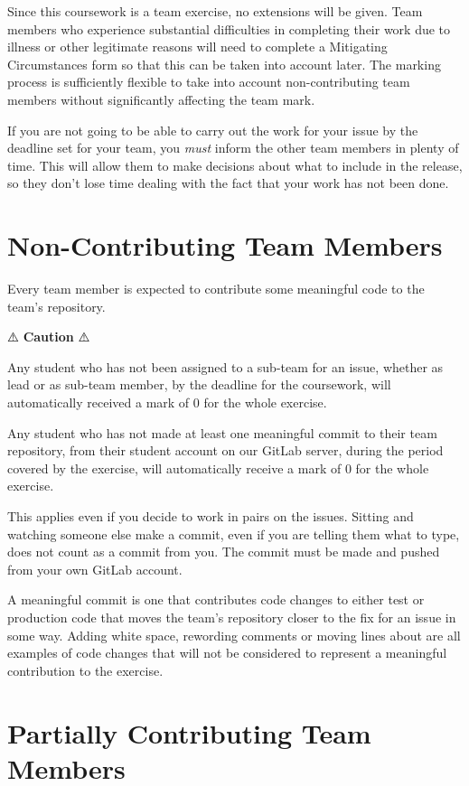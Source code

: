 \documentclass[
]{book}
\begin{document}
Since this coursework is a team exercise, no extensions will be given. Team members who experience substantial difficulties in completing their work due to illness or other legitimate reasons will need to complete a Mitigating Circumstances form so that this can be taken into account later. The marking process is sufficiently flexible to take into account non-contributing team members without significantly affecting the team mark.

If you are not going to be able to carry out the work for your issue by the deadline set for your team, you \emph{must} inform the other team members in plenty of time. This will allow them to make decisions about what to include in the release, so they don't lose time dealing with the fact that your work has not been done.

\hypertarget{nctm}{%
\section{Non-Contributing Team Members}\label{nctm}}

Every team member is expected to contribute some meaningful code to the team's repository.

⚠️ \textbf{Caution} ⚠️

Any student who has not been assigned to a sub-team for an issue, whether as lead or as sub-team member, by the deadline for the coursework, will automatically received a mark of 0 for the whole exercise.

Any student who has not made at least one meaningful commit to their team repository, from their student account on our GitLab server, during the period covered by the exercise, will automatically receive a mark of 0 for the whole exercise.

This applies even if you decide to work in pairs on the issues. Sitting and watching someone else make a commit, even if you are telling them what to type, does not count as a commit from you. The commit must be made and pushed from your own GitLab account.

A meaningful commit is one that contributes code changes to either test or production code that moves the team's repository closer to the fix for an issue in some way. Adding white space, rewording comments or moving lines about are all examples of code changes that will not be considered to represent a meaningful contribution to the exercise.

\hypertarget{partially-contributing-team-members}{%
\section{Partially Contributing Team Members}\label{partially-contributing-team-members}}
\end{document}
